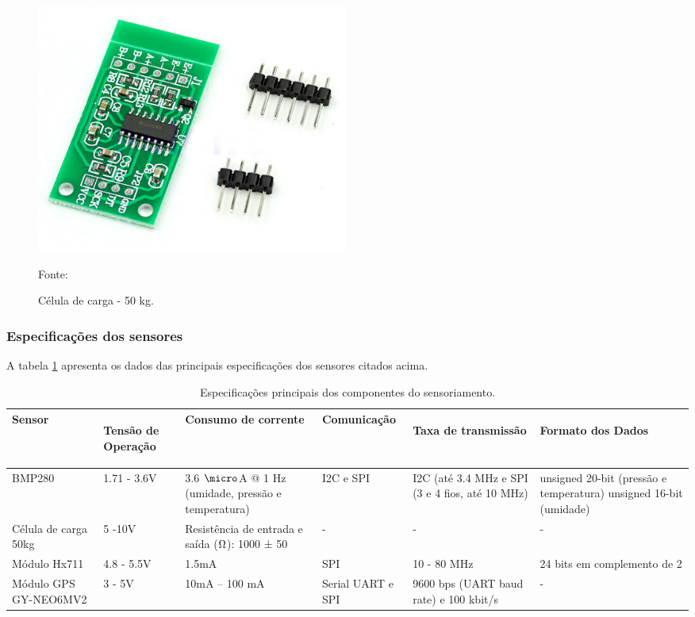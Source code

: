 \begin{figure}[H]
  \centering
  \includegraphics[scale=0.5]{figuras/conversorHX711.png}
  \caption{Célula de carga - 50 kg.}
  {\footnotesize Fonte: \cite{figura_HX711}} 
  \label{fig:conversorHX711}
\end{figure}

\subsubsection{Especificações dos sensores}
A tabela \ref{tab:sensores} apresenta os dados das principais especificações dos sensores citados acima.

\begin{center}
\begin{table}[H]
\centering
\begin{tabular}{ |m{2cm}|m{2cm}|m{2.5cm}|m{2.5cm}|m{2.5cm}|m{2.5cm}| } 
\hline

\textbf{ Sensor }&\begin{center}
\textbf{ Tensão de Operação} \end{center}& \textbf{Consumo de corrente }& \textbf{Comunicação} & \begin{center}\textbf{Taxa de transmissão} \end{center} & \begin{center}\textbf{Formato dos Dados}\end{center}\\ 
 \hline
 
 BMP280 & 1.71 - 3.6V & 3.6 $\micro$A @ 1 Hz (umidade, pressão e temperatura) & 
I2C e SPI & I2C (até 3.4 MHz e SPI (3 e 4 fios, até 10 MHz) & unsigned 20-bit (pressão e temperatura) unsigned 16-bit (umidade)\\
  \hline
Célula de carga 50kg & 5 -10V & Resistência de entrada e saída ($\ohm$): 1000 ± 50 & - & - & - \\
  \hline
 Módulo Hx711 & 4.8 - 5.5V & 1.5mA & SPI & 10 - 80 MHz & 24 bits em complemento de 2 \\ 
  \hline
 Módulo GPS GY-NEO6MV2 & 3 - 5V & 10mA – 100 mA & Serial UART e SPI & 9600 bps (UART baud rate) e 100 kbit/s & - \\ 
 \hline 

\end{tabular}
\caption{Especificações principais dos componentes do sensoriamento.}
\label{tab:sensores}
\end{table}
\end{center}


